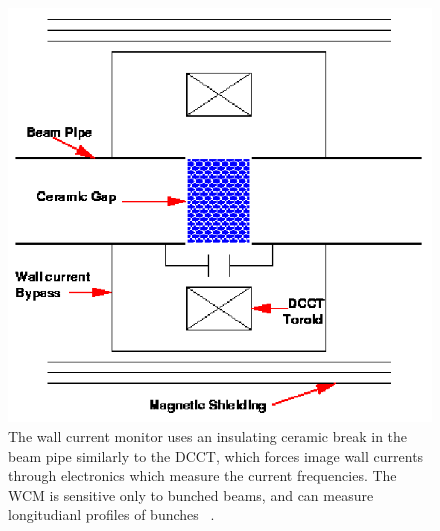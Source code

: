 \begin{figure}
\begin{center}
\includegraphics[width=0.75\linewidth]{../DataStreams/figs/dcct_schematic_cartoon}
\caption{The wall current monitor uses an insulating ceramic break in the beam pipe
similarly to the DCCT, which forces image wall currents through electronics which measure
the current frequencies. The WCM is sensitive only to bunched beams, and can measure
longitudianl profiles of bunches ~\cite{kawallfocus2005}.}
\label{fig:dcct_schematic_cartoon}
\end{center}
\end{figure}
